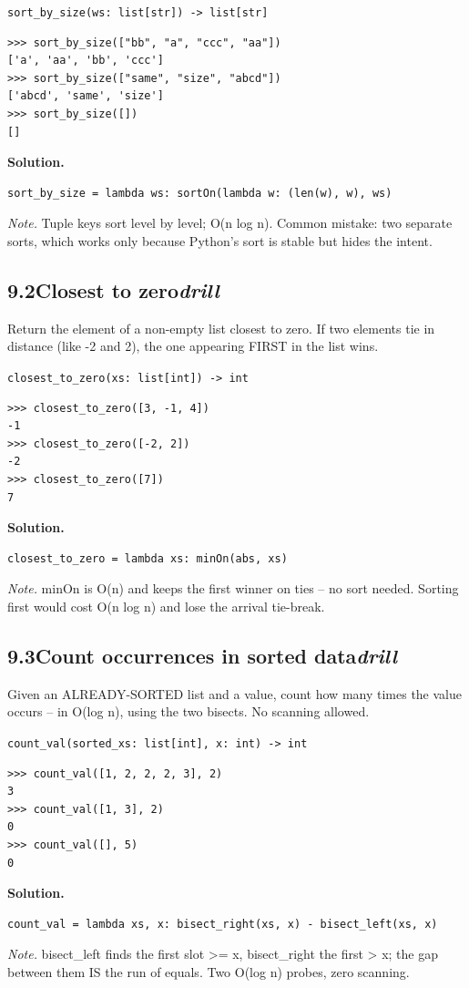 \documentclass[10pt,letterpaper]{book}
\begin{document}
\noindent\texttt{sort\_by\_size(ws: list[str]) -> list[str]}
\begin{lstlisting}[style=ex]
>>> sort_by_size(["bb", "a", "ccc", "aa"])
['a', 'aa', 'bb', 'ccc']
>>> sort_by_size(["same", "size", "abcd"])
['abcd', 'same', 'size']
>>> sort_by_size([])
[]
\end{lstlisting}
\noindent\textbf{Solution.}
\begin{lstlisting}[style=code]
sort_by_size = lambda ws: sortOn(lambda w: (len(w), w), ws)
\end{lstlisting}
\noindent\textit{Note.} Tuple keys sort level by level; O(n log n). Common mistake: two separate sorts, which works only because Python's sort is stable but hides the intent.

\subsection*{9.2\quad Closest to zero\hfill\textnormal{\textit{drill}}}
Return the element of a non-empty list closest to zero. If two elements tie in distance (like -2 and 2), the one appearing FIRST in the list wins.

\noindent\texttt{closest\_to\_zero(xs: list[int]) -> int}
\begin{lstlisting}[style=ex]
>>> closest_to_zero([3, -1, 4])
-1
>>> closest_to_zero([-2, 2])
-2
>>> closest_to_zero([7])
7
\end{lstlisting}
\noindent\textbf{Solution.}
\begin{lstlisting}[style=code]
closest_to_zero = lambda xs: minOn(abs, xs)
\end{lstlisting}
\noindent\textit{Note.} minOn is O(n) and keeps the first winner on ties -- no sort needed. Sorting first would cost O(n log n) and lose the arrival tie-break.

\subsection*{9.3\quad Count occurrences in sorted data\hfill\textnormal{\textit{drill}}}
Given an ALREADY-SORTED list and a value, count how many times the value occurs -- in O(log n), using the two bisects. No scanning allowed.

\noindent\texttt{count\_val(sorted\_xs: list[int], x: int) -> int}
\begin{lstlisting}[style=ex]
>>> count_val([1, 2, 2, 2, 3], 2)
3
>>> count_val([1, 3], 2)
0
>>> count_val([], 5)
0
\end{lstlisting}
\noindent\textbf{Solution.}
\begin{lstlisting}[style=code]
count_val = lambda xs, x: bisect_right(xs, x) - bisect_left(xs, x)
\end{lstlisting}
\noindent\textit{Note.} bisect\_left finds the first slot >= x, bisect\_right the first > x; the gap between them IS the run of equals. Two O(log n) probes, zero scanning.
\end{document}
